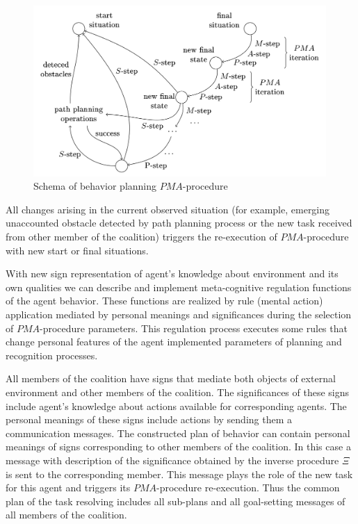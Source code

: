 \documentclass[runningheads,a4paper]{llncs}
\begin{document}
\begin{figure}
	\centering
	\includegraphics[height=6.5cm]{beh_plan}
	\caption{Schema of behavior planning $PMA$-procedure}
	\label{fig:bplan}
\end{figure}

All changes arising in the current observed situation (for example, emerging unaccounted obstacle detected by path planning process or the new task received from other member of the coalition) triggers the re-execution of $PMA$-procedure with new start or final situations.

With new sign representation of agent's knowledge about environment and its own qualities we can describe and implement meta-cognitive regulation functions of the agent behavior. These functions are realized by rule (mental action) application mediated by personal meanings and significances during the selection of $PMA$-procedure parameters. This regulation process executes some rules that change personal features of the agent implemented parameters of planning and recognition processes.

All members of the coalition have signs that mediate both objects of external environment and other members of the coalition. The significances of these signs include agent's knowledge about actions available for corresponding agents. The personal meanings of these signs include actions by sending them a communication messages.
The constructed plan of behavior can contain personal meanings of signs corresponding to other members of the coalition. In this case a message with description of the significance obtained by the inverse procedure $\Xi$ is sent to the corresponding member. This message plays the role of the new task for this agent and triggers its $PMA$-procedure re-execution. Thus the common plan of the task resolving includes all sub-plans and all goal-setting messages of all members of the coalition.
\end{document}
